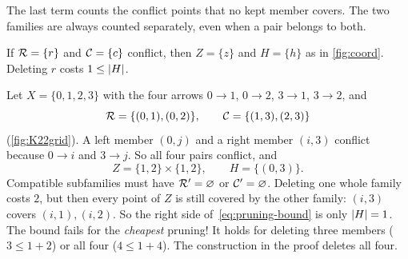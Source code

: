 The last term counts the conflict points that no kept member covers. The
two families are always counted separately, even when a pair belongs to both.

\begin{example}\label{ex:one-conflict}
If $\mathcal R=\{r\}$ and $\mathcal C=\{c\}$ conflict, then $Z=\{z\}$ and $H=\{h\}$ as in
\cref{fig:coord}. Deleting $r$ costs $1\le\lvert H\rvert$.
\end{example}

\begin{example}\label{ex:K22}
Let $X=\{0,1,2,3\}$ with the four arrows $0\to1$, $0\to2$, $3\to1$, $3\to2$, and
\[
 \mathcal R=\{(0,1),(0,2)\},\qquad \mathcal C=\{(1,3),(2,3)\}
\]
(\cref{fig:K22grid}). A left member $(0,j)$ and a right member $(i,3)$
conflict because $0\to i$ and $3\to j$. So all four pairs conflict, and
\[
 Z=\{1,2\}\times\{1,2\},\qquad H=\{(0,3)\}.
\]
Compatible subfamilies must have $\mathcal R'=\varnothing$ or $\mathcal C'=\varnothing$.
Deleting one whole family costs $2$, but then every point of $Z$ is still
covered by the other family: $(i,3)$ covers $(i,1),(i,2)$. So the right side
of~\eqref{eq:pruning-bound} is only $\lvert H\rvert=1$. The bound fails for the
\emph{cheapest} pruning! It holds for deleting three members ($3\le1+2$) or
all four ($4\le1+4$). The construction in the proof deletes all four.
\end{example}

